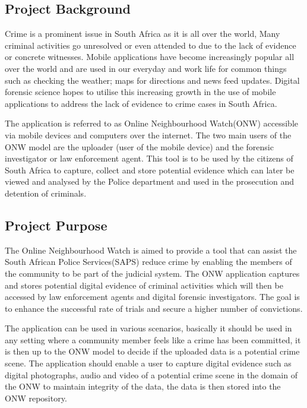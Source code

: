 \documentclass[a4paper,12pt]{article}
\begin{document}
\subsection{Project Background}
Crime is a prominent issue in South Africa as it is all over the world, Many criminal activities go unresolved or even attended to due to the lack of evidence or concrete witnesses.  Mobile applications have become increasingly popular all over the world and are used in our everyday and work life for common things such as checking the weather; maps for directions and news feed updates.  Digital forensic science hopes to utilise this increasing growth in the use of mobile applications to address the lack of evidence to crime cases in South Africa.

The application is referred to as Online Neighbourhood Watch(ONW) accessible via mobile devices and computers over the internet.  The two main users of the ONW model are the uploader (user of the mobile device) and the forensic investigator or law enforcement agent. 
This tool is to be used by the citizens of South Africa to capture, collect and store potential evidence which can later be viewed and analysed by the Police department and used in the prosecution and detention of criminals.
\subsection{Project Purpose}
The Online Neighbourhood Watch is aimed to provide a tool that can assist the South African Police Services(SAPS) reduce crime by enabling the members of the community to be part of the judicial system.  The ONW application captures and stores potential digital evidence of criminal activities which will then be accessed by law enforcement agents and digital forensic investigators.  The goal is to enhance the successful rate of trials and secure a higher number of convictions.

The application can be used in various scenarios, basically it should be used in any setting where a community member feels like a crime has been committed, it is then up to the ONW model to decide if the uploaded data is a potential crime scene. The application should enable a user to capture digital evidence such as digital photographs, audio and video of a potential crime scene in the domain of the ONW to maintain integrity of the data, the data is then stored into the ONW repository.
\end{document}
